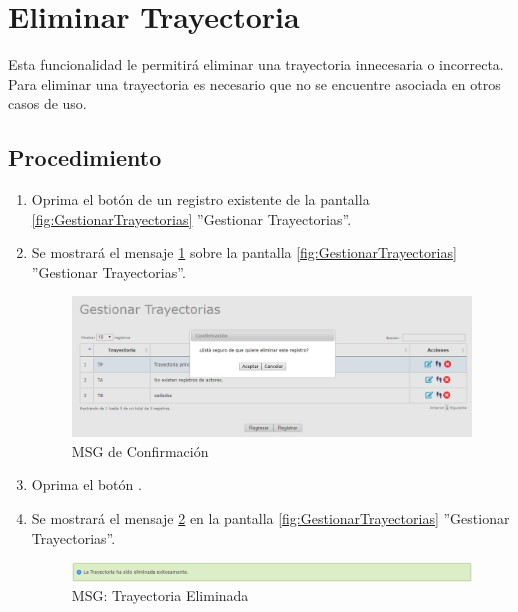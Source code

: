 \hypertarget{cv:eliminarTray}{\section{Eliminar Trayectoria}} \label{sec:eliminarTray}

	Esta funcionalidad le permitirá eliminar una trayectoria innecesaria o incorrecta. Para eliminar una trayectoria es necesario que no se encuentre asociada en otros casos de uso.

		\subsection{Procedimiento}

			\begin{enumerate}
	
			\item Oprima el botón \IUBotonEliminar{} de un registro existente de la pantalla \ref{fig:GestionarTrayectorias} ''Gestionar Trayectorias''.
	
			\item Se mostrará el mensaje \ref{fig:confirmaEliminaTray} sobre la pantalla \ref{fig:GestionarTrayectorias} ''Gestionar Trayectorias''.
			
			\begin{figure}[htbp!]
				\begin{center}
					\includegraphics[scale=0.6]{roles/lider/casosUso/trayectorias/pantallas/IU6-1-1-3MSG10}
					\caption{MSG de Confirmación}
					\label{fig:confirmaEliminaTray}
				\end{center}
			\end{figure}
						
			\item Oprima el botón \IUAceptar.
			
			\item Se mostrará el mensaje \ref{fig:trayEliminada} en la pantalla \ref{fig:GestionarTrayectorias} ''Gestionar Trayectorias''.
			
			\begin{figure}[htbp!]
				\begin{center}
					\includegraphics[scale=0.6]{roles/lider/casosUso/trayectorias/pantallas/IU6-1-1-3MSG1}
					\caption{MSG: Trayectoria Eliminada}
					\label{fig:trayEliminada}
				\end{center}
			\end{figure}
			\end{enumerate}